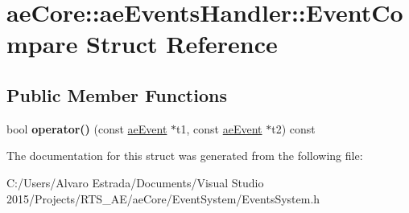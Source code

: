 \hypertarget{structae_core_1_1ae_events_handler_1_1_event_compare}{}\section{ae\+Core\+:\+:ae\+Events\+Handler\+:\+:Event\+Compare Struct Reference}
\label{structae_core_1_1ae_events_handler_1_1_event_compare}
\subsection*{Public Member Functions}
\begin{DoxyCompactItemize}
\item 
bool {\bfseries operator()} (const \hyperlink{structae_core_1_1ae_event}{ae\+Event} $\ast$t1, const \hyperlink{structae_core_1_1ae_event}{ae\+Event} $\ast$t2) const \hypertarget{structae_core_1_1ae_events_handler_1_1_event_compare_aa20b566bddab1abaaf5a253bac03eebe}{}\label{structae_core_1_1ae_events_handler_1_1_event_compare_aa20b566bddab1abaaf5a253bac03eebe}

\end{DoxyCompactItemize}


The documentation for this struct was generated from the following file\+:\begin{DoxyCompactItemize}
\item 
C\+:/\+Users/\+Alvaro Estrada/\+Documents/\+Visual Studio 2015/\+Projects/\+R\+T\+S\+\_\+\+A\+E/ae\+Core/\+Event\+System/Events\+System.\+h\end{DoxyCompactItemize}

